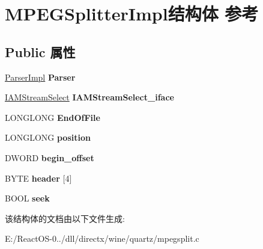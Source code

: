 \hypertarget{struct_m_p_e_g_splitter_impl}{}\section{M\+P\+E\+G\+Splitter\+Impl结构体 参考}
\label{struct_m_p_e_g_splitter_impl}
\subsection*{Public 属性}
\begin{DoxyCompactItemize}
\item 
\mbox{\label{struct_m_p_e_g_splitter_impl_ad55f584d499d648d3107f8d728ce4532}} 
\hyperlink{struct_parser_impl}{Parser\+Impl} {\bfseries Parser}
\item 
\mbox{\label{struct_m_p_e_g_splitter_impl_a699c3b1299722859de9cf5b6e3e5e436}} 
\hyperlink{interface_i_a_m_stream_select}{I\+A\+M\+Stream\+Select} {\bfseries I\+A\+M\+Stream\+Select\+\_\+iface}
\item 
\mbox{\label{struct_m_p_e_g_splitter_impl_a82f972ae86b8de6712acd8a5f5ccb3c3}} 
L\+O\+N\+G\+L\+O\+NG {\bfseries End\+Of\+File}
\item 
\mbox{\label{struct_m_p_e_g_splitter_impl_a278d23ef302efb7fcb890590de7ea387}} 
L\+O\+N\+G\+L\+O\+NG {\bfseries position}
\item 
\mbox{\label{struct_m_p_e_g_splitter_impl_a2d682a2c9420339e18e251efd3e676f2}} 
D\+W\+O\+RD {\bfseries begin\+\_\+offset}
\item 
\mbox{\label{struct_m_p_e_g_splitter_impl_a1a12050dae4c25303ed4b2d04d9e0bf2}} 
B\+Y\+TE {\bfseries header} \mbox{[}4\mbox{]}
\item 
\mbox{\label{struct_m_p_e_g_splitter_impl_a7bf1bd6d6ff80220de2a7807121ace6c}} 
B\+O\+OL {\bfseries seek}
\end{DoxyCompactItemize}


该结构体的文档由以下文件生成\+:\begin{DoxyCompactItemize}
\item 
E\+:/\+React\+O\+S-\/0../dll/directx/wine/quartz/mpegsplit.\+c\end{DoxyCompactItemize}
